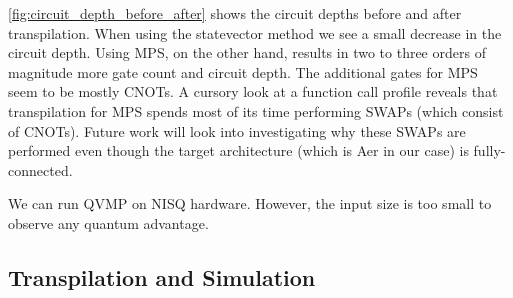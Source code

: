 \documentclass[11pt]{article}
\theoremstyle{definition}
\theoremstyle{remark}
\begin{document}
\cref{fig:circuit_depth_before_after} shows the circuit depths before and after
transpilation. When using the statevector method we see a small decrease in the
circuit depth. Using MPS, on the other hand, results in two to three orders of
magnitude more gate count and circuit depth. The additional gates for MPS seem
to be mostly CNOTs. A cursory look at a function call profile reveals that
transpilation for MPS spends most of its time performing SWAPs (which consist of
CNOTs). Future work will look into investigating why these SWAPs are performed
even though the target architecture (which is Aer in our case) is
fully-connected.

We can run QVMP on NISQ hardware. However, the input size is too small to
observe any quantum advantage.

\subsection{Transpilation and Simulation}
\end{document}
